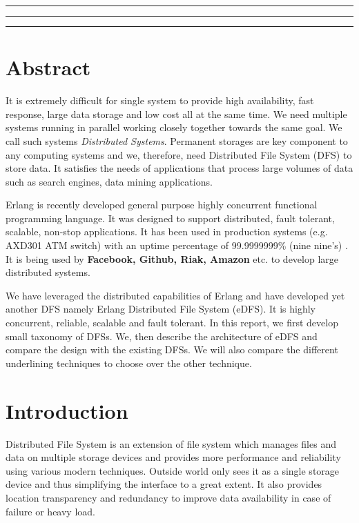 \documentclass[a4paper,12pt]{article}
\begin{document}

\tableofcontents
\vspace{0.5cm}
\hrule \hrule \hrule
\newpage

\section*{Abstract}
It is extremely difficult for single system to provide high availability, fast response, large data storage and low cost all at the same time. We need multiple systems running in parallel working closely together towards the same goal. We call such systems \textit{Distributed Systems}. Permanent storages are key component to any computing systems and we, therefore, need Distributed File System (DFS) to store data. It satisfies the needs of applications that process large volumes of data such as search engines, data mining applications.

Erlang \cite{erlang} is recently developed general purpose highly concurrent functional programming language. It was designed to support distributed, fault tolerant, scalable, non-stop applications. It has been used in production systems (e.g. AXD301 ATM switch) with an uptime percentage of 99.9999999\% (nine nine's) \cite[p.~170]{armstrong} \cite{blog_joe}. It is being used by \textbf{Facebook, Github, Riak, Amazon} etc. to develop large distributed systems.

We have leveraged the distributed capabilities of Erlang and have developed yet another DFS namely Erlang Distributed File System (eDFS). It is highly concurrent, reliable, scalable and fault tolerant. In this report, we first develop small taxonomy of DFSs. We, then describe the architecture of eDFS and compare the design with the existing DFSs. We will also compare the different underlining techniques to choose over the other technique.

\section{Introduction}
Distributed File System is an extension of file system which manages files and data on multiple storage devices and provides more performance and reliability using various modern techniques. Outside world only sees it as a single storage device and thus simplifying the interface to a great extent. It also provides location transparency and redundancy to improve data availability in case of failure or heavy load.
\end{document}
